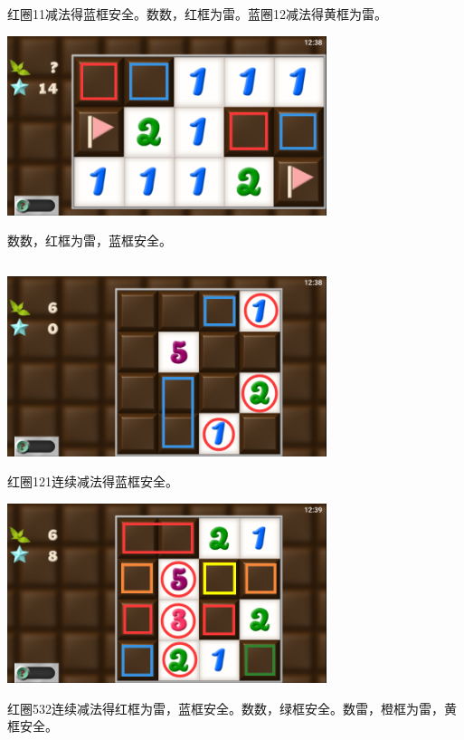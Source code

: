 红圈11减法得蓝框安全。数数，红框为雷。蓝圈12减法得黄框为雷。
\begin{center}
    \includegraphics[width=0.7\textwidth]{puzzle/85-5.png}
\end{center}
数数，红框为雷，蓝框安全。

\subsection{} %
\begin{center}
    \includegraphics[width=0.7\textwidth]{puzzle/86-1.png}
\end{center}
红圈121连续减法得蓝框安全。
\begin{center}
    \includegraphics[width=0.7\textwidth]{puzzle/86-2.png}
\end{center}
红圈532连续减法得红框为雷，蓝框安全。数数，绿框安全。数雷，橙框为雷，黄框安全。

